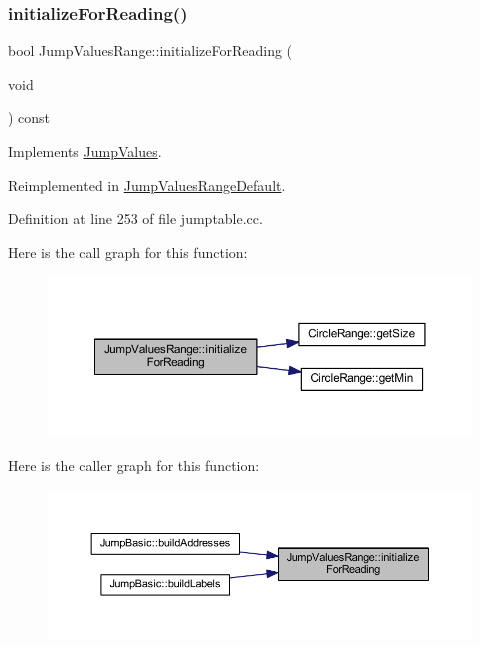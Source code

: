 \subsubsection{\texorpdfstring{initializeForReading()}{initializeForReading()}}
{\footnotesize\ttfamily bool Jump\+Values\+Range\+::initialize\+For\+Reading (\begin{DoxyParamCaption}\item[{void}]{ }\end{DoxyParamCaption}) const\hspace{0.3cm}{\ttfamily [virtual]}}



Implements \mbox{\hyperlink{class_jump_values_a9de7071bd67d3507636128fe2c537f71}{Jump\+Values}}.



Reimplemented in \mbox{\hyperlink{class_jump_values_range_default_aa179eae73d98e8ce8f7fee639ef078ae}{Jump\+Values\+Range\+Default}}.



Definition at line 253 of file jumptable.\+cc.

Here is the call graph for this function\+:
\nopagebreak
\begin{figure}[H]
\begin{center}
\leavevmode
\includegraphics[width=350pt]{class_jump_values_range_a92e0970fd19cd188a82078752a10948d_cgraph}
\end{center}
\end{figure}
Here is the caller graph for this function\+:
\nopagebreak
\begin{figure}[H]
\begin{center}
\leavevmode
\includegraphics[width=350pt]{class_jump_values_range_a92e0970fd19cd188a82078752a10948d_icgraph}
\end{center}
\end{figure}
\mbox{\label{class_jump_values_range_adeedbb8db9a84ff0422e61dcb76848fe}} 
